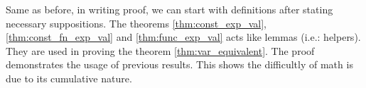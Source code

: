 Same as before, in writing proof, we can start with definitions after stating necessary suppositions.
The theorems \ref{thm:const_exp_val}, \ref{thm:const_fn_exp_val} and \ref{thm:func_exp_val} acts like lemmas (i.e.: helpers).
They are used in proving the theorem \ref{thm:var_equivalent}.
The proof demonstrates the usage of previous results.
This shows the difficultly of math is due to its cumulative nature.